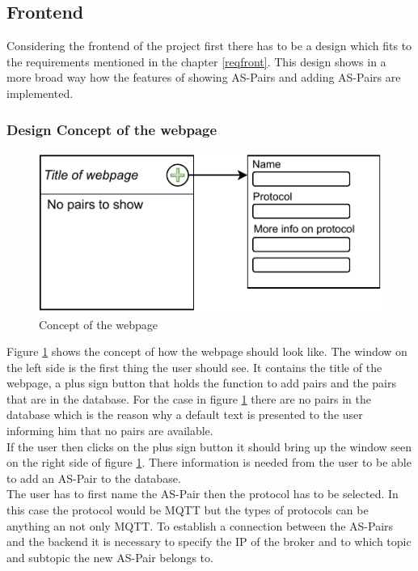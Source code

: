 \subsection{Frontend}\label{concept_fron}
Considering the frontend of the project first there has to be a design which fits to the requirements mentioned in the chapter \ref{reqfront}. This design shows in a more broad way how the features of showing AS-Pairs and adding AS-Pairs are implemented. \\

\subsubsection{Design Concept of the webpage}

\begin{figure}[H]
    \centering
    \includegraphics[width=.65\textwidth]{images/4_3/concept-webpage.pdf}
    \caption{Concept of the webpage}
    \label{fig:concept-webpage}
\end{figure}

Figure \ref{fig:concept-webpage} shows the concept of how the webpage should look like. The window on the left side is the first thing the user should see. It contains the title of the webpage, a plus sign button that holds the function to add pairs and the pairs that are in the database. For the case in figure \ref{fig:concept-webpage} there are no pairs in the database which is the reason why a default text is presented to the user informing him that no pairs are available. \\

If the user then clicks on the plus sign button it should bring up the window seen on the right side of figure \ref{fig:concept-webpage}. There information is needed from the user to be able to add an AS-Pair to the database. \\

The user has to first name the AS-Pair then the protocol has to be selected. In this case the protocol would be MQTT but the types of protocols can be anything an not only MQTT. To establish a connection between the AS-Pairs and the backend it is necessary to specify the IP of the broker and to which topic and subtopic the new AS-Pair belongs to. \newpage

